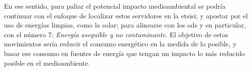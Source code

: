     En ese sentido, para paliar el potencial impacto medioambiental se podría continuar con el enfoque de localizar estos servidores en la \gls{etsisi}; y apostar por el uso de energías limpias, como la solar; para alinearse con los \gls{ods} y en particular, con el número 7: \textit{Energía asequible y no contaminante}. El objetivo de estos movimientos sería reducir el consumo energético en la medida de lo posible, y basar ese consumo en fuentes de energía que tengan un impacto lo más reducido posible en el medioambiente.